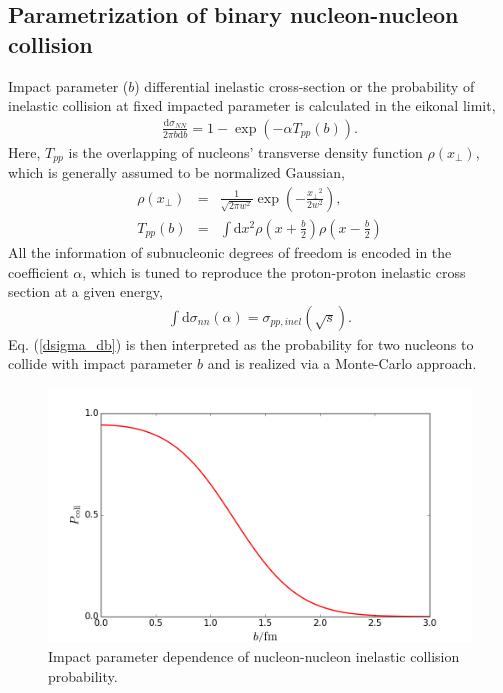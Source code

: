\documentclass[aps,prl,twocolumn,groupedaddress]{revtex4-1}
\begin{document}
	\subsection{Parametrization of binary nucleon-nucleon collision}
	Impact parameter ($b$) differential inelastic cross-section or the probability of inelastic collision at fixed impacted parameter is calculated in the eikonal limit,
	\begin{eqnarray}\label{dsigma_db}
		\frac{\mathrm{d}\sigma_{NN}}{2\pi b \mathrm{d}b} = 1 - \exp\left(-\alpha T_{pp} (b)\right).
	\end{eqnarray}
Here, $T_{pp}$ is the overlapping of nucleons' transverse density function $\rho(x_\perp)$, which is generally assumed to be normalized Gaussian,
	\begin{eqnarray}
		\rho(x_\perp) &=& \frac{1}{\sqrt{2\pi w^2}}\exp\left(-\frac{{x_\perp}^2}{2w^2}\right), \\
		T_{pp}(b) &=& \int \mathrm{d}{x}^2 \rho(x+\frac{b}{2})\rho(x-\frac{b}{2})
	\end{eqnarray}
	All the information of subnucleonic degrees of freedom is encoded in the coefficient $\alpha$, which is tuned to reproduce the proton-proton inelastic cross section at a given energy,
	\begin{eqnarray}
		\int \mathrm{d}\sigma_{nn}(\alpha) = \sigma_{pp, inel}(\sqrt{s}).
	\end{eqnarray}
	Eq. (\ref{dsigma_db}) is then interpreted as the probability for two nucleons to collide with impact parameter $b$ and is realized via a Monte-Carlo approach.
	\begin{figure}
	\begin{center}
	\includegraphics[width=\columnwidth]{pics/Pcoll.png}
	\caption{Impact parameter dependence of nucleon-nucleon inelastic collision probability.}
	\end{center}
	\end{figure}
\end{document}
